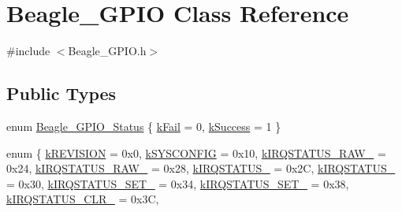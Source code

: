 \hypertarget{class_beagle___g_p_i_o}{\section{\-Beagle\-\_\-\-G\-P\-I\-O \-Class \-Reference}
\label{class_beagle___g_p_i_o}
}


{\ttfamily \#include $<$\-Beagle\-\_\-\-G\-P\-I\-O.\-h$>$}

\subsection*{\-Public \-Types}
\begin{DoxyCompactItemize}
\item 
enum \hyperlink{class_beagle___g_p_i_o_a40ebd672d74de41bbf5944109e1302ee}{\-Beagle\-\_\-\-G\-P\-I\-O\-\_\-\-Status} \{ \hyperlink{class_beagle___g_p_i_o_a40ebd672d74de41bbf5944109e1302eea115553a9517b306e3bf301889cfc8e8b}{k\-Fail} =  0, 
\hyperlink{class_beagle___g_p_i_o_a40ebd672d74de41bbf5944109e1302eea67ec988d80fec5692e8b893c795da682}{k\-Success} =  1
 \}
\item 
enum \{ \*
\hyperlink{class_beagle___g_p_i_o_abf819302a5fe343fcc95c1357d96528da4733479f85bb944ca3b7a3ac587edd12}{k\-R\-E\-V\-I\-S\-I\-O\-N} =  0x0, 
\hyperlink{class_beagle___g_p_i_o_abf819302a5fe343fcc95c1357d96528da67dc1bc91624f33b689b1e669e2906ce}{k\-S\-Y\-S\-C\-O\-N\-F\-I\-G} =  0x10, 
\hyperlink{class_beagle___g_p_i_o_abf819302a5fe343fcc95c1357d96528da468e61836dc15650b6fbf4db514a7ab6}{k\-I\-R\-Q\-S\-T\-A\-T\-U\-S\-\_\-\-R\-A\-W\-\_} =  0x24, 
\hyperlink{class_beagle___g_p_i_o_abf819302a5fe343fcc95c1357d96528da1a763f396960bf29deb9ef201da940d2}{k\-I\-R\-Q\-S\-T\-A\-T\-U\-S\-\_\-\-R\-A\-W\-\_} =  0x28, 
\*
\hyperlink{class_beagle___g_p_i_o_abf819302a5fe343fcc95c1357d96528da0e986029016be5c7fb13650516bd3f3c}{k\-I\-R\-Q\-S\-T\-A\-T\-U\-S\-\_} =  0x2\-C, 
\hyperlink{class_beagle___g_p_i_o_abf819302a5fe343fcc95c1357d96528da96b61f40f64daae7246c43bc053f1daf}{k\-I\-R\-Q\-S\-T\-A\-T\-U\-S\-\_} =  0x30, 
\hyperlink{class_beagle___g_p_i_o_abf819302a5fe343fcc95c1357d96528da40d1c2177900e08fa0a82f32a843c096}{k\-I\-R\-Q\-S\-T\-A\-T\-U\-S\-\_\-\-S\-E\-T\-\_} =  0x34, 
\hyperlink{class_beagle___g_p_i_o_abf819302a5fe343fcc95c1357d96528da4a85feeabc32101602bbe924dafc701d}{k\-I\-R\-Q\-S\-T\-A\-T\-U\-S\-\_\-\-S\-E\-T\-\_} =  0x38, 
\*
\hyperlink{class_beagle___g_p_i_o_abf819302a5fe343fcc95c1357d96528da4ffdf38ac5eca208f2498ab48d65245c}{k\-I\-R\-Q\-S\-T\-A\-T\-U\-S\-\_\-\-C\-L\-R\-\_} =  0x3\-C, 

\end{DoxyCompactItemize}
